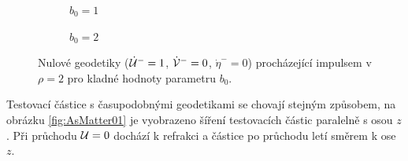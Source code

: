 \begin{figure}[ht]
    \centering
    \begin{subfigure}[b]{0.45\textwidth}
        \caption{$b_0 = 1$}
    \end{subfigure}
    \hfill
    \begin{subfigure}[b]{0.45\textwidth}
        \caption{$b_0 = 2$}
    \end{subfigure}
\caption{Nulové geodetiky ($\dot {\mathcal{U}}^-=1$, $\dot {\mathcal{V}}^-=0$, $\dot \eta^-=0$) procházející impulsem v $\rho=2$ pro kladné hodnoty parametru $b_0$.}
\label{fig:ASNullFyzikalnejsi}
\end{figure}

Testovací částice s časupodobnými geodetikami se chovají stejným způsobem, na obrázku \ref{fig:AsMatter01} je vyobrazeno
šíření testovacích částic paralelně s osou $z$. Při průchodu $\mathcal{U} = 0$ dochází k refrakci a částice po průchodu letí směrem k ose $z$.

